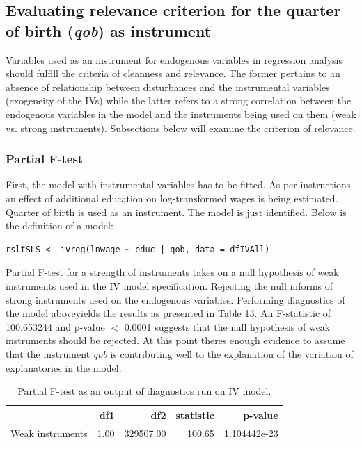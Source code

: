 \documentclass{article}
\begin{document}
\subsection{Evaluating relevance criterion for the quarter of birth (\emph{qob}) as instrument}

Variables used as an instrument for endogenous variables in regression analysis should fulfill the criteria of cleanness and relevance. The former pertains to an absence of relationship between disturbances and the instrumental variables (exogeneity of the IVs) while the latter refers to a strong correlation between the endogenous variables in the model and the instruments being used on them (weak vs. strong instruments). Subsections below will examine the criterion of relevance.

\subsubsection{Partial F-test}
\label{partialftest}
First, the model with instrumental variables has to be fitted. As per instructions, an effect of additional education on log-transformed wages is being estimated. Quarter of birth is used as an instrument. The model is just identified. Below is the definition of a model:
\begin{verbatim}
rsltSLS <- ivreg(lnwage ~ educ | qob, data = dfIVAll)
\end{verbatim}

Partial F-test for a strength of instruments takes on a null hypothesis of weak instruments used in the IV model specification. Rejecting the null informs of strong instruments used on the endogenous variables. Performing diagnostics of the model aboveyields the results as presented in \hyperref[tab:ftest]{Table 13}. An F-statistic of 100.653244 and p-value $<$ 0.0001 suggests that the null hypothesis of weak instruments should be rejected. At this point theres enough evidence to assume that the instrument \textit{qob} is contributing well to the explanation of the variation of explanatories in the model. 

\begin{table}[!htbp] \centering 
  \caption{Partial F-test as an output of diagnostics run on IV model.} 
  \label{tab:ftest} 
\begin{tabular}{rrrrr}
  \hline
 & df1 & df2 & statistic & p-value \\ 
  \hline
Weak instruments & 1.00 & 329507.00 & 100.65 & 1.104442e-23 \\  
   \hline
\end{tabular}
\end{table}
\end{document}
